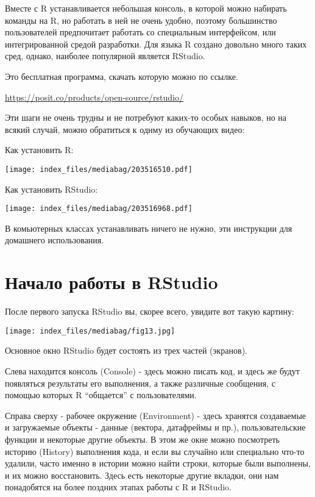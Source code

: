 \documentclass[
  letterpaper,
  DIV=11,
  numbers=noendperiod]{scrreprt}
\begin{document}
Вместе с R устанавливается небольшая консоль, в которой можно набирать
команды на R, но работать в ней не очень удобно, поэтому большинство
пользователей предпочитает работать со специальным интерфейсом, или
интегрированной средой разработки. Для языка R создано довольно много
таких сред, однако, наиболее популярной является RStudio.

Это бесплатная программа, скачать которую можно по ссылке.

\url{https://posit.co/products/open-source/rstudio/}

Эти шаги не очень трудны и не потребуют каких-то особых навыков, но на
всякий случай, можно обратиться к однму из обучающих видео:

Как установить R:

\texttt{[image: index\_files/mediabag/203516510.pdf]}

Как установить RStudio:

\texttt{[image: index\_files/mediabag/203516968.pdf]}

В комьютерных классах устанавливать ничего не нужно, эти инструкции для
домашнего использования.

\hypertarget{ux43dux430ux447ux430ux43bux43e-ux440ux430ux431ux43eux442ux44b-ux432-rstudio}{%
\section{Начало работы в
RStudio}\label{ux43dux430ux447ux430ux43bux43e-ux440ux430ux431ux43eux442ux44b-ux432-rstudio}}

После первого запуска RStudio вы, скорее всего, увидите вот такую
картину:

\texttt{[image: index\_files/mediabag/fig13.jpg]}

Основное окно RStudio будет состоять из трех частей (экранов).

Слева находится консоль (Console) - здесь можно писать код, и здесь же
будут появляться результаты его выполнения, а также различные сообщения,
с помощью которых R ``общается'' с пользователями.

Справа сверху - рабочее окружение (Environment) - здесь хранятся
создаваемые и загружаемые объекты - данные (вектора, датафреймы и пр.),
пользовательские функции и некоторые другие объекты. В этом же окне
можно посмотреть историю (History) выполнения кода, и если вы случайно
или специально что-то удалили, часто именно в истории можно найти
строки, которые были выполнены, и их можно восстановить. Здесь есть
некоторые другие вкладки, они нам понадобятся на более поздних этапах
работы с R и RStudio.
\end{document}
